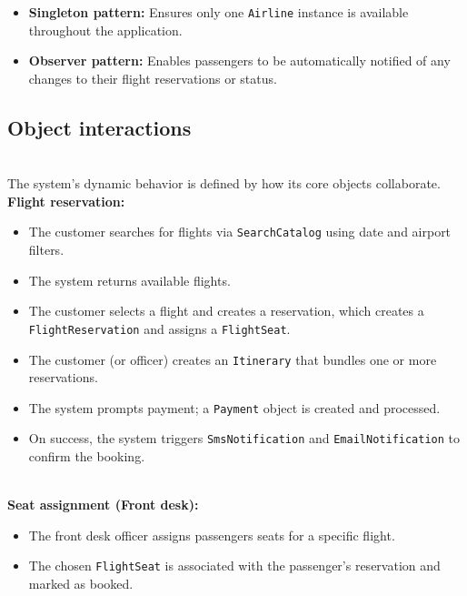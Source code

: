 \begin{itemize}
\item
\protect{}\label{HJW8K5zh-efYgdy3hn1mk}
\textbf{Singleton pattern:} Ensures only one \texttt{Airline} instance is available throughout the application.
\item
\protect{}\label{DyadHm2Arg2rIZwIX2M_Q}
\textbf{Observer pattern:} Enables passengers to be automatically notified of any changes to their flight reservations or status.
\end{itemize}

\subsection{Object interactions}\label{wxnL_BnzIIS7aH9OxnPiz}
\\
The system's dynamic behavior is defined by how its core objects collaborate.
\\
\textbf{Flight reservation:}

\begin{itemize}
\item
\protect{}\label{uqv2H2plZm8W6k8e3KGS_}
The customer searches for flights via \texttt{SearchCatalog} using date and airport filters.
\item
\protect{}\label{31FbM54ZpxjTmtn7UpCru}
The system returns available flights.
\item
\protect{}\label{IaFCPRuNlT9VNgY5otoFF}
The customer selects a flight and creates a reservation, which creates a \texttt{FlightReservation} and assigns a \texttt{FlightSeat}.
\item
\protect{}\label{az8ICvaKky2LlU6dBm136}
The customer (or officer) creates an \texttt{Itinerary} that bundles one or more reservations.
\item
\protect{}\label{jZU-Q6lXgcDAwOYDekOHk}
The system prompts payment; a \texttt{Payment} object is created and processed.
\item
\protect{}\label{CqRSt4dz2S4K47EDpjkn3}
On success, the system triggers \texttt{SmsNotification} and \texttt{EmailNotification} to confirm the booking.
\end{itemize}
\\
\textbf{Seat assignment (Front desk):}

\begin{itemize}
\item
\protect{}\label{gDLVanMcEy18AgnGgYeOR}
The front desk officer assigns passengers seats for a specific flight.
\item
\protect{}\label{0FT7HJ8wgy2FUQXHkwXnb}
The chosen \texttt{FlightSeat} is associated with the passenger's reservation and marked as booked.
\end{itemize}

